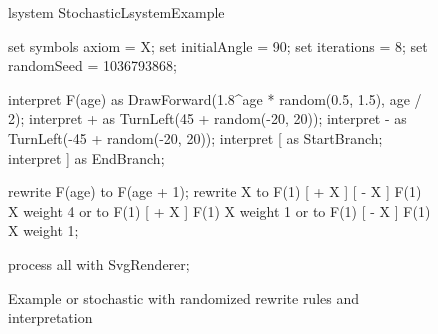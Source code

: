 \begin{figure}[ht]
	\begin{Lsystem}
lsystem StochasticLsystemExample {
	set symbols axiom = X;
	set initialAngle = 90;
	set iterations = 8;
	set randomSeed = 1036793868;

	interpret F(age) as DrawForward(1.8^age * random(0.5, 1.5), age / 2);
	interpret + as TurnLeft(45 + random(-20, 20));
	interpret - as TurnLeft(-45 + random(-20, 20));
	interpret [ as StartBranch;
	interpret ] as EndBranch;

	rewrite F(age) to F(age + 1);
	rewrite X
		to F(1) [ + X ] [ - X ] F(1) X  weight 4 or
		to F(1) [ + X ] F(1) X          weight 1 or
		to F(1) [ - X ] F(1) X          weight 1;
}
process all with SvgRenderer;
	\end{Lsystem}
	\caption{Example or stochastic \lsystems with randomized rewrite rules and interpretation}
	\label{fig:randExample}
\end{figure}

